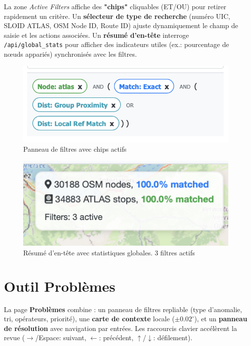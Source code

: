 La zone \textit{Active Filters} affiche des \textbf{"chips"} cliquables (ET/OU) pour retirer rapidement un critère. Un \textbf{sélecteur de type de recherche} (numéro UIC, SLOID ATLAS, OSM Node ID, Route ID) ajuste dynamiquement le champ de saisie et les actions associées. Un \textbf{résumé d'en-tête} interroge \texttt{/api/global\_stats} pour afficher des indicateurs utiles (ex.: pourcentage de nœuds appariés) synchronisés avec les filtres.

\begin{figure}[h]
  \centering
  \includegraphics[width=\textwidth]{../figures/chap9/filter_chips_index.png}
  \caption{Panneau de filtres avec \og chips \fg{} actifs}
  \label{fig:frontend-filters-chips}
\end{figure}

\begin{figure}[h]
  \centering
  \includegraphics[width=\textwidth]{../figures/chap9/stats box.png}
  \caption{Résumé d'en-tête avec statistiques globales. 3 filtres actifs}
  \label{fig:frontend-filters}
\end{figure}

\section{Outil Problèmes}

La page \textbf{Problèmes} combine : un panneau de filtres repliable (type d'anomalie, tri, opérateurs, priorité), une \textbf{carte de contexte} locale (\(\pm 0.02^\circ\)), et un \textbf{panneau de résolution} avec navigation par entrées. Les raccourcis clavier accélèrent la revue (\(\rightarrow\)/Espace: suivant, \(\leftarrow\): précédent, \(\uparrow\)/\(\downarrow\): défilement).

